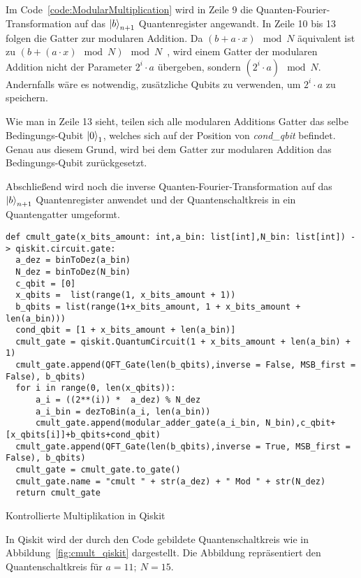 Im Code~\ref{code:ModularMultiplication} wird in Zeile 9 die Quanten-Fourier-Transformation auf 
das \(\ket{b}_{n+1}\) Quantenregister angewandt.
In Zeile 10 bis 13 folgen die Gatter zur modularen Addition.
Da \((b + a \cdot x) \mod N\) äquivalent ist zu \((b + (a \cdot x)\mod N) \mod N\)~\cite{koepf_modular_2021}, 
wird einem Gatter der modularen Addition nicht der Parameter \(2^i\cdot a\) übergeben, 
sondern \((2^i\cdot a)\mod N\).
Andernfalls wäre es notwendig, 
zusätzliche Qubits zu verwenden, um \(2^i\cdot a\) zu speichern.

Wie man in Zeile 13 sieht, teilen sich alle modularen Additions Gatter das selbe Bedingungs-Qubit \(\ket{0}_1\), 
welches sich auf der Position von \textit{cond\_qbit} befindet.
Genau aus diesem Grund, wird bei dem Gatter zur modularen Addition das Bedingungs-Qubit zurückgesetzt.

Abschließend wird noch die inverse Quanten-Fourier-Transformation auf das \(\ket{b}_{n+1}\) Quantenregister anwendet und 
der Quantenschaltkreis in ein Quantengatter umgeformt.

\begin{listing}[H]
\begin{verbatim}  
def cmult_gate(x_bits_amount: int,a_bin: list[int],N_bin: list[int]) -> qiskit.circuit.gate:  
  a_dez = binToDez(a_bin)
  N_dez = binToDez(N_bin)
  c_qbit = [0]
  x_qbits =  list(range(1, x_bits_amount + 1))
  b_qbits = list(range(1+x_bits_amount, 1 + x_bits_amount + len(a_bin)))
  cond_qbit = [1 + x_bits_amount + len(a_bin)]
  cmult_gate = qiskit.QuantumCircuit(1 + x_bits_amount + len(a_bin) + 1)
  cmult_gate.append(QFT_Gate(len(b_qbits),inverse = False, MSB_first = False), b_qbits)
  for i in range(0, len(x_qbits)):
      a_i = ((2**(i)) *  a_dez) % N_dez
      a_i_bin = dezToBin(a_i, len(a_bin))
      cmult_gate.append(modular_adder_gate(a_i_bin, N_bin),c_qbit+[x_qbits[i]]+b_qbits+cond_qbit)
  cmult_gate.append(QFT_Gate(len(b_qbits),inverse = True, MSB_first = False), b_qbits)
  cmult_gate = cmult_gate.to_gate()
  cmult_gate.name = "cmult " + str(a_dez) + " Mod " + str(N_dez)
  return cmult_gate
  \end{verbatim}
  \caption{Kontrollierte Multiplikation in Qiskit}
  \label{code:ModularMultiplication}
\end{listing}

In Qiskit wird der durch den Code gebildete Quantenschaltkreis wie in Abbildung~\ref{fig:cmult_qiskit} dargestellt.
Die Abbildung repräsentiert den Quantenschaltkreis für \(a = 11;~N = 15\).

